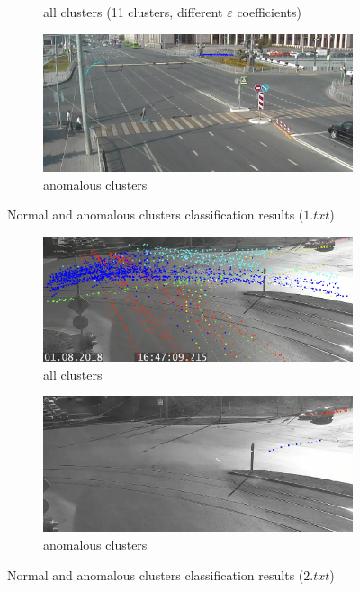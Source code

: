 \begin{figure}[!htb]
\begin{subfigure}[!htb]{0.495\textwidth}
		\caption{all clusters (11 clusters, different $\varepsilon$ coefficients)}
		\label{fig:cl-classif-norm-11}
	\end{subfigure}
	\hfill
	\begin{subfigure}[!htb]{0.495\textwidth}
		\centering{}
		\includegraphics[width=\textwidth]{images/cl-classif-anom-11.png}
		\caption{anomalous clusters}
		\label{fig:cl-classif-anom-11}
	\end{subfigure}
	\caption{Normal and anomalous clusters classification results ($1.txt$)}
	\label{fig:cl-classif-res-1}
\end{figure}

\begin{figure}[!htb]
	\centering
	\begin{subfigure}[!htb]{0.495\textwidth}
		\centering{}
		\includegraphics[width=\textwidth]{images/cl-classif-norm-2.jpeg}
		\caption{all clusters}
		\label{fig:cl-classif-norm-2}
	\end{subfigure}
	\hfill
	\begin{subfigure}[!htb]{0.495\textwidth}
		\centering{}
		\includegraphics[width=\textwidth]{images/cl-classif-anom-2.jpeg}
		\caption{anomalous clusters}
		\label{fig:cl-classif-anom-2}
	\end{subfigure}
	\caption{Normal and anomalous clusters classification results ($2.txt$)}
	\label{fig:cl-classif-res-2}
\end{figure}


